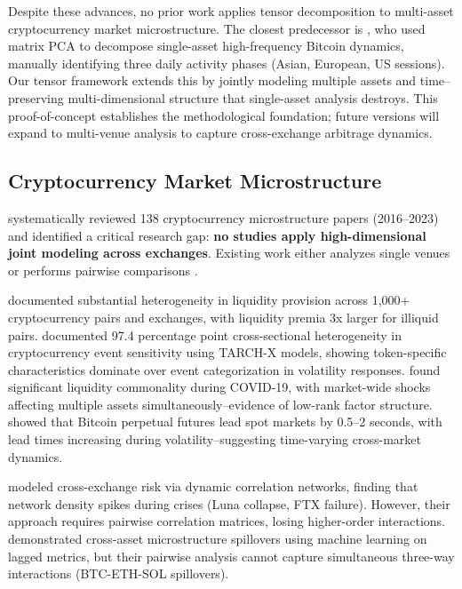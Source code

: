 \documentclass[11pt,twocolumn]{article}
\begin{document}
Despite these advances, no prior work applies tensor decomposition to multi-asset cryptocurrency market microstructure. The closest predecessor is \citet{Watorek2023Decomposing}, who used matrix PCA to decompose single-asset high-frequency Bitcoin dynamics, manually identifying three daily activity phases (Asian, European, US sessions). Our tensor framework extends this by jointly modeling multiple assets and time--preserving multi-dimensional structure that single-asset analysis destroys. This proof-of-concept establishes the methodological foundation; future versions will expand to multi-venue analysis to capture cross-exchange arbitrage dynamics.

\subsection{Cryptocurrency Market Microstructure}

\citet{Almeida2024Cryptocurrency} systematically reviewed 138 cryptocurrency microstructure papers (2016--2023) and identified a critical research gap: \textbf{no studies apply high-dimensional joint modeling across exchanges}. Existing work either analyzes single venues \citep{Bozzetto2023Microstructure} or performs pairwise comparisons \citep{Wang2024CrossExchange}.

\citet{Bianchi2022Trading} documented substantial heterogeneity in liquidity provision across 1,000+ cryptocurrency pairs and exchanges, with liquidity premia 3x larger for illiquid pairs. \citet{Farzulla2025Cryptocurrency} documented 97.4 percentage point cross-sectional heterogeneity in cryptocurrency event sensitivity using TARCH-X models, showing token-specific characteristics dominate over event categorization in volatility responses. \citet{Liu2025LiquidityCommonality} found significant liquidity commonality during COVID-19, with market-wide shocks affecting multiple assets simultaneously--evidence of low-rank factor structure. \citet{DeFreitas2025HighFreq} showed that Bitcoin perpetual futures lead spot markets by 0.5--2 seconds, with lead times increasing during volatility--suggesting time-varying cross-market dynamics.

\citet{Wang2024CrossExchange} modeled cross-exchange risk via dynamic correlation networks, finding that network density spikes during crises (Luna collapse, FTX failure). However, their approach requires pairwise correlation matrices, losing higher-order interactions. \citet{Easley2024CrossAsset} demonstrated cross-asset microstructure spillovers using machine learning on lagged metrics, but their pairwise analysis cannot capture simultaneous three-way interactions (BTC-ETH-SOL spillovers).
\end{document}
